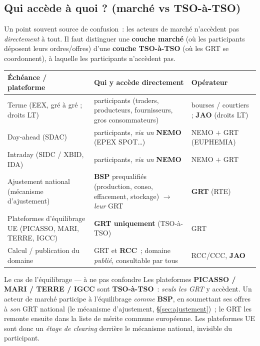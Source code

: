 \documentclass[11pt,a4paper]{article}
\begin{document}
\subsection{Qui accède à quoi ? (marché vs TSO-à-TSO)}
\label{sec:acces}

Un point souvent source de confusion~: les acteurs de marché n'accèdent pas
\emph{directement} à tout. Il faut distinguer une \textbf{couche marché}
(où les participants déposent leurs ordres/offres) d'une \textbf{couche
TSO-à-TSO} (où les GRT se coordonnent), à laquelle les participants
n'accèdent pas.

\begin{center}\footnotesize
\renewcommand{\arraystretch}{1.3}
\begin{tabular}{@{}p{3.9cm}p{6.0cm}p{3.3cm}@{}}
\toprule
\textbf{Échéance / plateforme} & \textbf{Qui y accède directement} & \textbf{Opérateur} \\
\midrule
Terme (EEX, gré à gré ; droits LT) & participants (traders, producteurs, fournisseurs, gros consommateurs) & bourses / courtiers ; \textbf{JAO} (droits LT) \\
Day-ahead (SDAC) & participants, \emph{via un} \textbf{NEMO} (EPEX SPOT\ldots) & NEMO $+$ GRT (EUPHEMIA) \\
Intraday (SIDC / XBID, IDA) & participants, \emph{via un} \textbf{NEMO} & NEMO $+$ GRT \\
Ajustement national (mécanisme d'ajustement) & \textbf{BSP} prequalifiés (production, conso, effacement, stockage) $\rightarrow$ \emph{leur} GRT & \textbf{GRT} (RTE) \\
Plateformes d'équilibrage UE (PICASSO, MARI, TERRE, IGCC) & \textbf{GRT uniquement} (TSO-à-TSO) & GRT \\
Calcul / publication du domaine & GRT et \textbf{RCC}~; domaine \emph{publié}, consultable par tous & RCC/CCC, \textbf{JAO} \\
\bottomrule
\end{tabular}
\end{center}

\begin{rembox}{Le cas de l'équilibrage — à ne pas confondre}
Les plateformes \textbf{PICASSO / MARI / TERRE / IGCC} sont \textbf{TSO-à-TSO}~:
\emph{seuls les GRT} y accèdent. Un acteur de marché participe à
l'équilibrage \emph{comme} \textbf{BSP}, en soumettant ses offres à \emph{son}
GRT national (le mécanisme d'ajustement, \S\ref{sec:ajustement})~; le GRT les
remonte ensuite dans la liste de mérite commune européenne. Les plateformes UE
sont donc un \emph{étage de clearing} derrière le mécanisme national, invisible
du participant.
\end{rembox}
\end{document}
